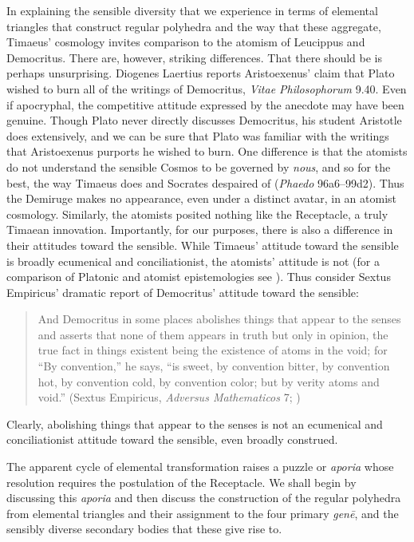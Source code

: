 In explaining the sensible diversity that we experience in terms of elemental triangles that construct regular polyhedra and the way that these aggregate, Timaeus' cosmology invites comparison to the atomism of Leucippus and Democritus. There are, however, striking differences. That there should be is perhaps unsurprising. Diogenes Laertius reports Aristoexenus' claim that Plato wished to burn all of the writings of Democritus, \emph{Vitae Philosophorum} 9.40. Even if apocryphal, the competitive attitude expressed by the anecdote may have been genuine. Though Plato never directly discusses Democritus, his student Aristotle does extensively, and we can be sure that Plato was familiar with the writings that Aristoexenus purports he wished to burn. One difference is that the atomists do not understand the sensible Cosmos to be governed by \emph{nous}, and so for the best, the way Timaeus does and Socrates despaired of (\emph{Phaedo} 96a6–99d2). Thus the Demiruge makes no appearance, even under a distinct avatar, in an atomist cosmology. Similarly, the atomists posited nothing like the Receptacle, a truly Timaean innovation. Importantly, for our purposes, there is also a difference in their attitudes toward the sensible. While Timaeus' attitude toward the sensible is broadly ecumenical and conciliationist, the atomists' attitude is not (for a comparison of Platonic and atomist epistemologies see \citealt{Lee:2005qr}). Thus consider Sextus Empiricus' dramatic report of Democritus' attitude toward the sensible:
\begin{quote}
	And Democritus in some places abolishes things that appear to the senses and asserts that none of them appears in truth but only in opinion, the true fact in things existent being the existence of atoms in the void; for ``By convention,'' he says, ``is sweet, by convention bitter, by convention hot, by convention cold, by convention color; but by verity atoms and void.'' (Sextus Empiricus, \emph{Adversus Mathematicos} 7; \citealt{Bury:1997uq})
\end{quote}
Clearly, abolishing things that appear to the senses is not an ecumenical and conciliationist attitude toward the sensible, even broadly construed.

The apparent cycle of elemental transformation raises a puzzle or \emph{aporia} whose resolution requires the postulation of the Receptacle. We shall begin by discussing this \emph{aporia} and then discuss the construction of the regular polyhedra from elemental triangles and their assignment to the four primary \emph{genē}, and the sensibly diverse secondary bodies that these give rise to. 

